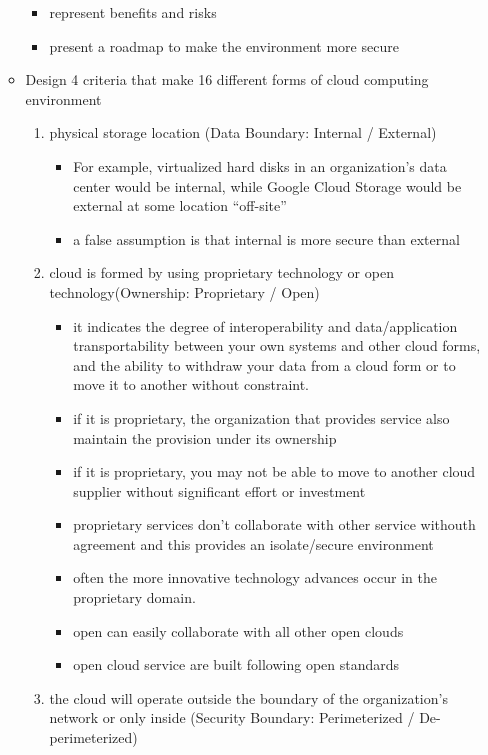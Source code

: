 \documentclass{article}
\begin{document}
\begin{itemize}
\begin{itemize}
\begin{itemize}
            \item represent benefits and risks
            \item present a roadmap to make the environment more secure
        \end{itemize}
        \item Design 4 criteria that make 16 different forms of cloud computing environment
        \begin{enumerate}
            \item physical storage location (Data Boundary: Internal / External)
            \begin{itemize}
                \item For example, virtualized hard disks in an organization’s data center would be internal, while Google Cloud Storage would be external at some location “off-site”
                \item a false assumption is that internal is more secure than external
            \end{itemize}
            \item cloud is formed by using proprietary technology or open technology(Ownership: Proprietary / Open)
            \begin{itemize}
                \item it indicates the degree of interoperability and data/application transportability between your own systems and other cloud forms, and the ability to withdraw your data from a cloud form or to move it to another without constraint.
                \item if it is proprietary, the organization that provides service also maintain the provision under its ownership
                \item if it is proprietary, you may not be able to move to another cloud supplier without significant effort or investment
                \item proprietary services don't collaborate with other service withouth agreement and this provides an isolate/secure environment
                \item often the more innovative technology advances occur in the proprietary domain.
                \item open can easily collaborate with all other open clouds
                \item open cloud service are built following open standards
            \end{itemize}
            \item the cloud will operate outside the boundary of the organization's network or only inside (Security Boundary: Perimeterized / De-perimeterized)

\end{enumerate}
\end{itemize}
\end{itemize}
\end{document}

